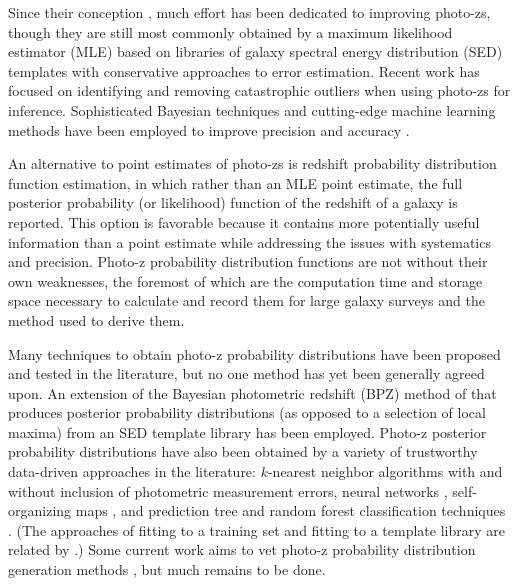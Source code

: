 \documentclass[preprint]{aastex}
\begin{document}
Since their conception \citep{Baum1962}, much effort has been dedicated to 
improving photo-zs, though they are still most commonly obtained by a maximum 
likelihood estimator (MLE) based on libraries of galaxy spectral energy 
distribution (SED) templates with conservative approaches to error estimation.  
Recent work has focused on identifying and removing catastrophic outliers when 
using photo-zs for inference.  \citep{Gorecki2014}  Sophisticated Bayesian 
techniques and cutting-edge machine learning methods have been employed to 
improve precision \citep{Carliles2010} and accuracy \citep{Sadeh2015}. 

An alternative to point estimates of photo-zs is redshift probability 
distribution function estimation, in which rather than an MLE point estimate, 
the full posterior probability (or likelihood) function of the redshift of a 
galaxy is reported.  \citep{Koo1999}  This option is favorable because it 
contains more potentially useful information than a point estimate while 
addressing the issues with systematics and precision.  Photo-z probability 
distribution functions are not without their own weaknesses, the foremost of 
which are the computation time and storage space necessary to calculate and 
record them for large galaxy surveys \citep{CarrascoKind2014} and the method 
used to derive them.

Many techniques to obtain photo-z probability distributions have been proposed 
and tested in the literature, but no one method has yet been generally agreed 
upon.  An extension of the Bayesian photometric redshift (BPZ) method of 
\citet{Benitez2000} that produces posterior probability distributions (as 
opposed to a selection of local maxima) from an SED template library has been 
employed.  \citep{Hildebrandt2012, Kelly2014, Lopez-Sanjuan2015}  Photo-z 
posterior probability distributions have also been obtained by a variety of 
trustworthy data-driven approaches in the literature: $k$-nearest neighbor 
algorithms with \citep{Ball2008} and without \citep{Sheldon2012} inclusion of 
photometric measurement errors, neural networks \citep{Bonnett2015a}, 
self-organizing maps \citep{CarrascoKind2014a}, and prediction tree and random 
forest classification techniques \citep{Carliles2010, CarrascoKind2013}.  (The 
approaches of fitting to a training set and fitting to a template library are 
related by \citet{Budavari2009}.)  Some current work aims to vet photo-z 
probability distribution generation methods \citep{Wittman2016}, but much 
remains to be done.
\end{document}
